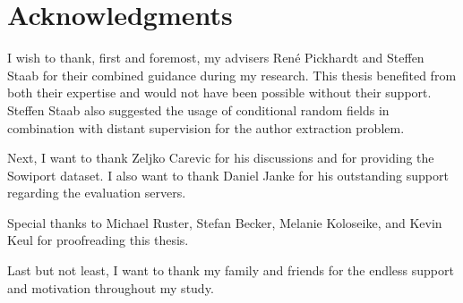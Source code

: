 \chapter*{Acknowledgments}

I wish to thank, first and foremost, my advisers Ren\'e Pickhardt and Steffen Staab for their combined guidance during my research.
This thesis benefited from both their expertise and would not have been possible without their support.
Steffen Staab also suggested the usage of conditional random fields in combination with distant supervision for the author extraction problem.

Next, I want to thank Zeljko Carevic for his discussions and for providing the Sowiport dataset.
I also want to thank Daniel Janke for his outstanding support regarding the evaluation servers.

Special thanks to Michael Ruster, Stefan Becker, Melanie Koloseike, and Kevin Keul for proofreading this thesis.

Last but not least, I want to thank my family and friends for the endless support and motivation throughout my study.

